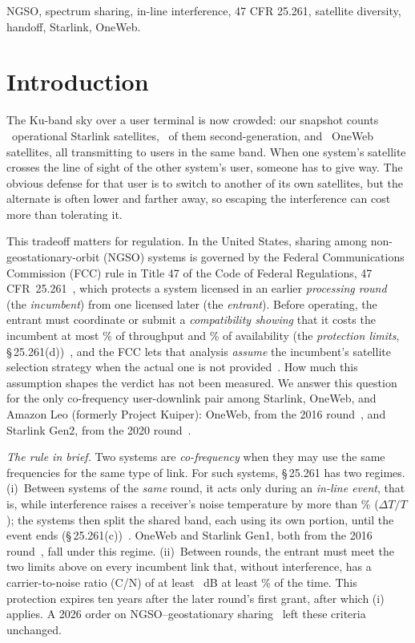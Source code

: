 \documentclass[conference]{IEEEtran}
\begin{document}
\begin{IEEEkeywords}
NGSO, spectrum sharing, in-line interference, 47 CFR 25.261, satellite
diversity, handoff, Starlink, OneWeb.
\end{IEEEkeywords}

\section{Introduction}
The Ku-band sky over a user terminal is now crowded: our snapshot counts
\NStarlinkOperational\ operational Starlink satellites, \NStarlinkGenTwo\ of them
second-generation, and \NOnewebOp\ OneWeb satellites, all transmitting to users
in the same band. When one system's satellite crosses the line of sight of the
other system's user, someone has to give way. The obvious defense for that user
is to switch to another of its own satellites, but the alternate is often lower
and farther away, so escaping the interference can cost more than tolerating it.

This tradeoff matters for regulation. In the United States, sharing among
non-geostationary-orbit (NGSO) systems is governed by the Federal Communications
Commission (FCC) rule in Title 47 of the Code of Federal Regulations,
47 CFR~25.261~\cite{cfr25261}, which protects a system
licensed in an earlier \emph{processing round} (the \emph{incumbent}) from one
licensed later (the \emph{entrant}). Before operating, the entrant must coordinate
or submit a \emph{compatibility showing} that it costs the incumbent at most
\DegradeLimitPct\% of throughput and \UnavailLimitPct\% of availability
(the \emph{protection limits}, \S\,25.261(d))~\cite{fcc24117}, and the FCC lets that analysis \emph{assume} the
incumbent's satellite selection strategy when the actual one is not
provided~\cite{fcc24117}. How much this assumption shapes the verdict has not been
measured. We answer this question for the only co-frequency user-downlink pair
among Starlink, OneWeb, and Amazon Leo (formerly Project Kuiper): OneWeb, from
the 2016 round~\cite{fcc1777}, and Starlink Gen2, from the 2020
round~\cite{fcc2291}.

\emph{The rule in brief.} Two systems are \emph{co-frequency} when they may use
the same frequencies for the same type of link. For such systems, \S\,25.261 has
two regimes. (i)~Between systems of the \emph{same} round, it acts only during an
\emph{in-line event}, that is, while interference raises a receiver's noise
temperature by more than \DttThresholdPct\% ($\Delta T/T$); the systems then split
the shared band, each using its own portion, until the event ends
(\S\,25.261(c))~\cite{cfr25261,fcc2329}. OneWeb and Starlink Gen1, both from the
2016 round~\cite{fcc1838}, fall under this regime. (ii)~Between rounds, the
entrant must meet the two limits above on every incumbent link that, without
interference, has a carrier-to-noise ratio (C/N) of at least \CnGateDb~dB at least
\RuleBaselineAvailPct\% of the time. This protection expires ten years after
the later round's first grant, after which (i) applies. A 2026 order on NGSO--geostationary sharing~\cite{fcc2626} left
these criteria unchanged.
\end{document}

